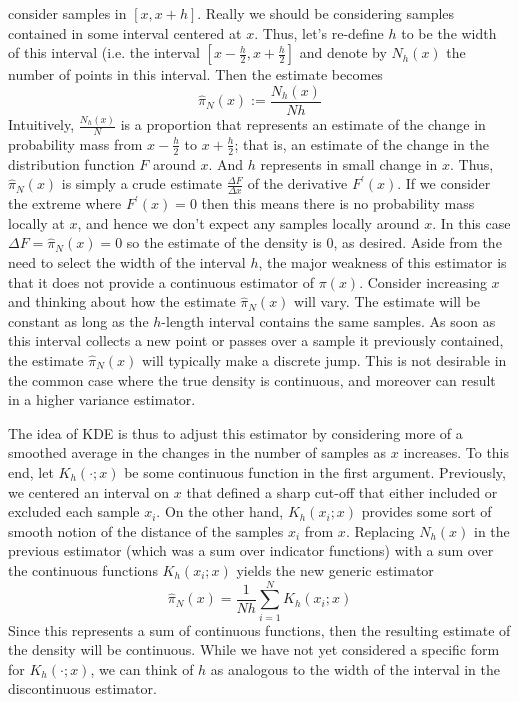 \documentclass[12pt]{article}
\begin{document}
consider samples in $[x, x + h]$. Really we should be considering samples contained in some interval centered at $x$. Thus, let's re-define $h$ to be the width of this interval (i.e. the interval $\left[x - \frac{h}{2}, x + \frac{h}{2}\right]$ 
and denote by $N_h(x)$ the number of points in this interval. Then the estimate becomes 
\[\hat{\pi}_N(x) := \frac{N_h(x)}{Nh}\]
Intuitively, $\frac{N_h(x)}{N}$ is a proportion that represents an estimate of the change in probability mass from $x - \frac{h}{2}$ to $x + \frac{h}{2}$; that is, an estimate of the change in the distribution function $F$ around $x$. And $h$ 
represents in small change in $x$. Thus, $\hat{\pi}_{N}(x)$ is simply a crude estimate $\frac{\Delta F}{\Delta x}$ of the derivative $F^\prime(x)$. If we consider the extreme where $F^\prime(x) = 0$ then this means there is no probability 
mass locally at $x$, and hence we don't expect any samples locally around $x$. In this case $\Delta F = \hat{\pi}_N(x) = 0$ so the estimate of the density is $0$, as desired. Aside from the need to select the width of the interval $h$, the major 
weakness of this estimator is that it does not provide a continuous estimator of $\pi(x)$. Consider increasing $x$ and thinking about how the estimate $\hat{\pi}_N(x)$ will vary. The estimate will be constant as long as the $h$-length interval 
contains the same samples. As soon as this interval collects a new point or passes over a sample it previously contained, the estimate $\hat{\pi}_N(x)$ will typically make a discrete jump. This is not desirable in the common case where the 
true density is continuous, and moreover can result in a higher variance estimator.

The idea of KDE is thus to adjust this estimator by considering more of a smoothed average in the changes in the number of samples as $x$ increases. To this end, let $K_h(\cdot; x)$ be some continuous function in the first argument. 
Previously, we centered an interval on $x$ that defined a sharp cut-off that either included or excluded each sample $x_i$. On the other hand, $K_h(x_i; x)$ provides some sort of smooth notion of the distance of the samples $x_i$ from $x$. 
Replacing $N_h(x)$ in the previous estimator (which was a sum over indicator functions) with a sum over the continuous functions $K_h(x_i; x)$ yields the new generic estimator 
\[\hat{\pi}_N(x) = \frac{1}{Nh} \sum_{i = 1}^{N} K_h(x_i; x)\]
Since this represents a sum of continuous functions, then the resulting estimate of the density will be continuous. 
While we have not yet considered a specific form for $K_h(\cdot; x)$, we can think of $h$ as analogous to the width of the interval in the discontinuous estimator. 
\end{document}
